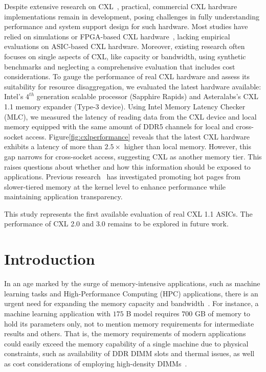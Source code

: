 Despite extensive research on CXL~\cite{cxl_azure,cxlcentric,demystify}, practical, commercial CXL hardware implementations remain in development, posing challenges in fully understanding performance and system support design for such hardware. Most studies have relied on simulations or FPGA-based CXL hardware~\cite{demystify,intelfpga}, lacking empirical evaluations on ASIC-based CXL hardware. Moreover, existing research often focuses on single aspects of CXL, like capacity or bandwidth, using synthetic benchmarks and neglecting a comprehensive evaluation that includes cost considerations. To gauge the performance of real CXL hardware and assess its suitability for resource disaggregation, we evaluated the latest hardware available: Intel's $\text{4}^{th}$ generation scalable processor (Sapphire Rapids) and Asteralabs's CXL 1.1 memory expander (Type-3 device). Using Intel Memory Latency Checker (MLC)\cite{mlc}, we measured the latency of reading data from the CXL device and local memory equipped with the same amount of DDR5 channels for local and cross-socket access. Figure\ref{fig:cxlperformance} reveals that the latest CXL hardware exhibits a latency of more than $2.5\times$ higher than local memory. However, this gap narrows for cross-socket access, suggesting CXL as another memory tier. This raises questions about whether and how this information should be exposed to applications. Previous research~\cite{tpp} has investigated promoting hot pages from slower-tiered memory at the kernel level to enhance performance while maintaining application transparency.

This study represents the first available evaluation of real CXL 1.1 ASICs. The performance of CXL 2.0 and 3.0 remains to be explored in future work.


\section{Introduction}
\label{sec:intro}

In an age marked by the surge of memory-intensive applications, such as machine learning tasks and High-Performance Computing (HPC) applications, there is an urgent need for expanding the memory capacity and bandwidth~\cite{dataintensive, FlatFlash, cxl-ssd}. 
For instance, a machine learning application with $175$ B model requires $700$ GB of memory to hold its parameters only, not to mention memory requirements for intermediate results and others. That is, the memory requirements of modern applications could easily exceed the memory capability of a single machine due to physical constraints, such as availability of DDR DIMM slots and thermal issues, as well as cost considerations of employing high-density DIMMs~\cite{FlatFlash, cxl-ssd}.

